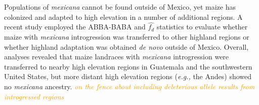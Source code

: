 \documentclass[11pt]{article}
\newcommand{\mbh}[1]{\textcolor{orange}{ \emph{\scriptsize  #1}} } %
\begin{document}
\begin{enumerate}
Populations of \emph{mexicana} cannot be found outside of Mexico, yet maize has colonized and adapted to high elevation in a number of additional regions.
A recent study \cite{wang2017} employed the ABBA-BABA and $\hat{f_{d}}$ statistics to evaluate whether maize with \emph{mexicana} introgression was transferred to other highland regions or whether highland adaptation was obtained \emph{de novo} outside of Mexico.
Overall, analyses revealed that maize landraces with \emph{mexicana} introgression were transferred to nearby high elevation regions in Guatemala and the southwestern United States, but more distant high elevation regions (\emph{e.g.,} the Andes) showed no \emph{mexicana} ancestry. \mbh{on the fence about including deleterious allele results from introgressed regions}



\end{enumerate}
\end{document}
